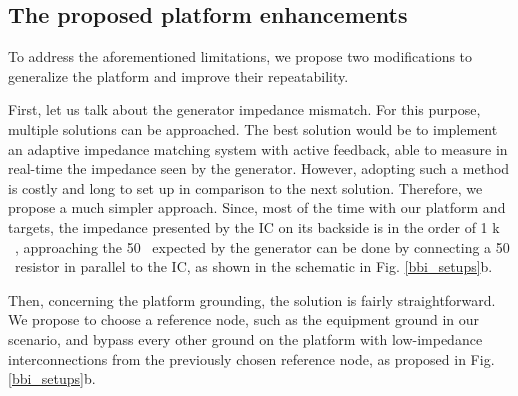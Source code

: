 	\subsection{The proposed platform enhancements}
		To address the aforementioned limitations, we propose two modifications to generalize the platform and improve  their repeatability.

		First, let us talk about the generator impedance mismatch.
		For this purpose, multiple solutions can be approached.
		The best solution would be to implement an adaptive impedance matching system with active feedback, able to measure in real-time the impedance seen by the generator.
		However, adopting such a method is costly and long to set up in comparison to the next solution.
		Therefore, we propose a much simpler approach.
		Since, most of the time with our platform and targets, the impedance presented by the IC on its backside is in the order of 1 k \textOmega\ \cite{mybbifdtc2023}, approaching the 50 \textOmega\ expected by the generator can be done by connecting a 50 \textOmega\ resistor in parallel to the IC, as shown in the schematic in Fig. \ref{bbi_setups}b.
		
		Then, concerning the platform grounding, the solution is fairly straightforward.
		We propose to choose a reference node, such as the equipment ground in our scenario, and bypass every other ground on the platform with low-impedance interconnections from the previously chosen reference node, as proposed in Fig. \ref{bbi_setups}b.

%

